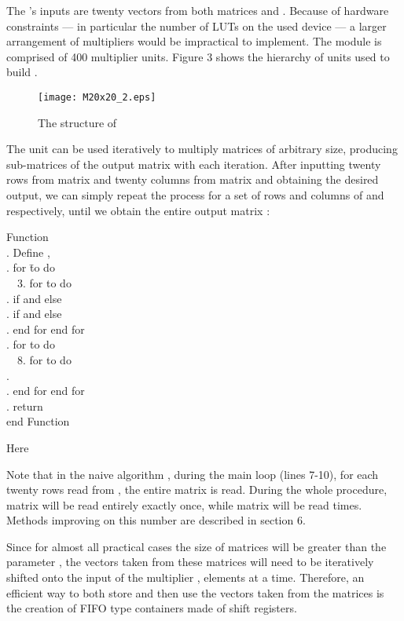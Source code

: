 \documentclass[11pt,twoside]{article}
\begin{document}
The 's inputs are twenty vectors from both matrices  and .
Because of hardware constraints --- in particular the number of LUTs on the used device --- a larger arrangement of multipliers would be impractical to implement. The module  is comprised of 400  multiplier units. Figure 3 shows the hierarchy of units used to build .

\begin{figure}[h!]
\centering
\texttt{[image: M20x20\_2.eps]}
\caption{The structure of }
\end{figure}

The  unit can be used iteratively to multiply matrices of arbitrary size, producing  sub-matrices of the output matrix  with each iteration. After inputting twenty rows from matrix  and twenty columns from matrix  and obtaining the desired output, we can simply repeat the process for a set of rows and columns of  and  respectively, until we obtain the entire output matrix :

\begin{tabbing}
Function \=  \\
. Define ,  \\
. for \=  to  do \\
\> \ \ 3. for  to  do \\
\> . if  and   else  \\
\> . if  and   else  \\
. end for end for \\
. for  to  do\\
\> \ \ 8. for  to  do \\
\> .  \\
. end for end for \\
. return  \\
end Function \\
\end{tabbing}

Here


Note that in the naive algorithm , during the main loop (lines 7-10), for each twenty rows read from , the entire matrix  is read. During the whole procedure, matrix  will be read entirely exactly once, while matrix  will be read  times. Methods improving on this number are described in section 6.

Since for almost all practical cases the size  of matrices  will be greater than the parameter , the vectors taken from these matrices will need to be iteratively shifted onto the input of the multiplier ,  elements at a time. Therefore, an efficient way to both store and then use the vectors taken from the matrices is the creation of FIFO type containers made of shift registers.
\end{document}
